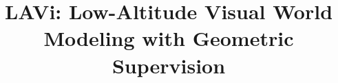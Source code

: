 \documentclass[10pt,twocolumn,letterpaper]{article}
\title{LAVi: Low-Altitude Visual World Modeling with Geometric Supervision}
\begin{document}
\maketitlesupplementary
\appendix
\renewcommand{\thetable}{S\arabic{table}}
\renewcommand{\theequation}{S\arabic{equation}}

{
    \small
    
    
}
\end{document}

